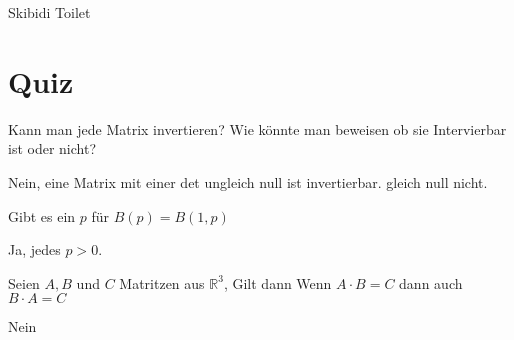 Skibidi Toilet

\section{Quiz}

Kann man jede Matrix invertieren? Wie könnte man beweisen ob sie Intervierbar
ist oder nicht?

Nein, eine Matrix mit einer det ungleich null ist invertierbar. gleich null
nicht.

Gibt es ein $p$ für $B(p) = B(1, p)$

Ja, jedes $p > 0$.

Seien $A, B$ und $C$ Matritzen aus $\mathbb{R}^3$, Gilt dann Wenn $A \cdot B =
    C$ dann auch $B \cdot A = C$

Nein